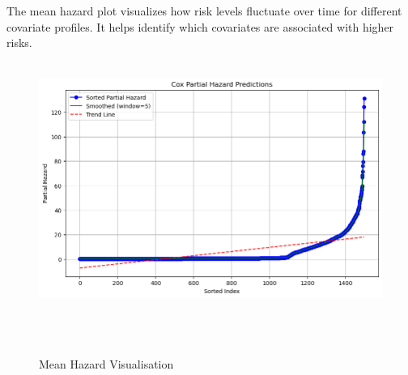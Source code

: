 \noindent The mean hazard plot visualizes how risk levels fluctuate over time for different covariate profiles. It helps identify which covariates are associated with higher risks.
\begin{figure}[h]
    \centering
    \includegraphics[width=\linewidth]{Figures/SURV/cox_hazard.png}
    \caption{Mean Hazard Visualisation}
    \label{fig:your_label}
\end{figure}

\clearpage
